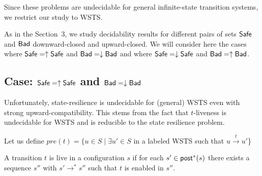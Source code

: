 


Since these problems are undecidable for general infinite-state transition systems, we restrict our study to WSTS.

As in the Section~3, we study decidability results for different pairs of sets $\textsf{Safe}$ and $\textsf{Bad}$ downward-closed and upward-closed. We will consider here the cases where 
$\textsf{Safe} = \uparrow \textsf{Safe}$ and $\textsf{Bad} = \downarrow \textsf{Bad}$ 
and where 
$\textsf{Safe} = \downarrow \textsf{Safe}$ and $\textsf{Bad} = \uparrow \textsf{Bad}$.


\subsection{Case: $\textsf{Safe} = \uparrow \textsf{Safe}$ and $\textsf{Bad} = \downarrow \textsf{Bad}$}




Unfortunately, state-resilience is undecidable for (general) WSTS even with strong upward-compatibility.
This stems from the fact that $t$-liveness is undecidable for WSTS and 
is reducible to the state resilience problem.

Let us define $pre(t)=\{ u \in S \mid \exists u' \in S$ in a labeled WSTS such that $u \xrightarrow{t} u'$\} 



A transition $t$ is live in a configuration $s$ if for each $s' \in \textsf{post}^*(s)$ there exists a sequence $s''$ with $s' \to^* s''$ such that $t$ is enabled in $s''$.

